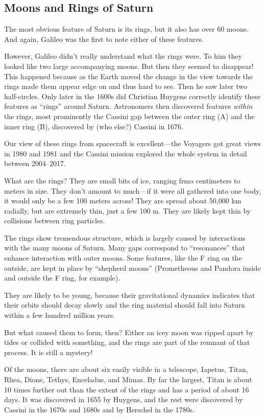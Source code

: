 \documentclass[12pt, preprint]{aastex}
\begin{document}
\subsection{Moons and Rings of Saturn}

The most obvious feature of Saturn is its rings, but it also has over
60 moons. And again, Galileo was the first to note either of these
features.

However, Galileo didn't really understand what the rings were. To him
they looked like two large accompanying moons. But then they seemed to
disappear! This happened because as the Earth moved the change in the
view towards the rings made them appear edge on and thus hard to
see. Then he saw later two half-circles. Only later in the 1600s did
Christian Huygens correctly identify these features as ``rings''
around Saturn. Astronomers then discovered features {\it within} the
rings, most prominently the Cassini gap between the outer ring (A) and
the inner ring (B), discovered by (who else?) Cassini in 1676.

Our view of these rings from spacecraft is excellent---the Voyagers got
great views in 1980 and 1981 and the Cassini mission explored the
whole system in detail between 2004--2017.

What are the rings? They are small bits of ice, ranging frmo
centimeters to meters in size. They don't amount to much---if it were
all gathered into one body, it would only be a few 100 meters
across! They are spread about 50,000 km radially, but are extremely
thin, just a few 100 m. They are likely kept thin by collisions
between ring particles.

The rings show tremendous structure, which is largely caused by
interactions with the many moons of Saturn. Many gaps correspond to
``resonances'' that enhance interaction with outer moons. Some
features, like the F ring on the outside, are kept in place by
``shepherd moons'' (Prometheous and Pandora inside and outside the F
ring, for example). 

They are likely to be young, because their gravitational dynamics
indicates that their orbits should decay slowly and the ring material
should fall into Saturn within a few hundred million years. 

But what caused them to form, then? Either an icey moon was ripped
apart by tides or collided with something, and the rings are part of
the remnant of that process. It is still a mystery!

Of the moons, there are about six easily visible in a telescope,
Iapetus, Titan, Rhea, Dione, Tethys, Enceladus, and Mimas.  By far the
largest, Titan is about 10 times further out than the extent of the
rings and has a period of about 16 days. It was discovered in 1655 by
Huygens, and the rest were discovered by Cassini in the 1670s and
1680s and by Herschel in the 1780s.
\end{document}
